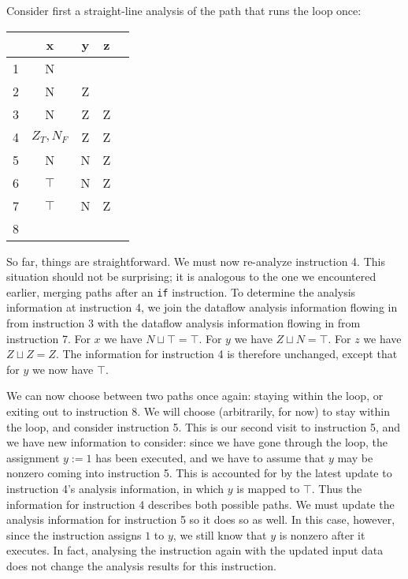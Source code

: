 \documentclass[11pt]{article}
\def\tablespace{\vspace{2ex}}
\newcommand{\join}{\sqcup}
\begin{document}
Consider first a straight-line analysis of the path that runs the loop once:

\tablespace
\begin{tabular}{r | c c c l}

  & x & y & z \\
\hline
1 & N &   &   \\
2 & N & Z &   \\
3 & N & Z & Z \\
4 & $Z_T,N_F$ & Z & Z \\
5 & N & N & Z \\
6 & $\top$ & N & Z \\
7 & $\top$ & N & Z \\
8 &   &   &   \\

\end{tabular}
\tablespace

So far, things are straightforward.  We must now re-analyze instruction 4.  This
situation should not be surprising; it is analogous to the one we encountered
earlier, merging paths after an \texttt{if} instruction.  To determine the
analysis information at instruction 4, we join the dataflow analysis information
flowing in from instruction 3 with the dataflow analysis information flowing in
from instruction 7.  For $x$ we have $N \join \top = \top$.  For $y$ we have $Z
\join N = \top$.  For $z$ we have $Z \join Z = Z$.  The information for
instruction 4 is therefore unchanged, except that for $y$ we now have $\top$.

We can now choose between two paths once again: staying within the loop, or
exiting out to instruction 8.  We will choose (arbitrarily, for now) to stay
within the loop, and consider instruction 5.  This is our second visit to
instruction 5, and we have new information to consider: since we have gone
through the loop, the assignment $y := 1$ has been executed, and we have to
assume that $y$ may be nonzero coming into instruction 5.  This is accounted for
by the latest update to instruction 4's analysis information, in which $y$ is
mapped to $\top$.  Thus the information for instruction 4 describes both
possible paths.  We must update the analysis information for instruction 5 so it
does so as well.  In this case, however, since the instruction assigns $1$ to
$y$, we still know that $y$ is nonzero after it executes.  In fact, analysing
the instruction again with the updated input data does not change the analysis
results for this instruction.
\end{document}
